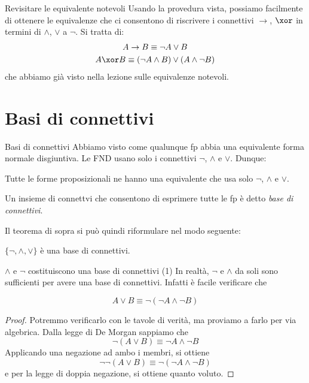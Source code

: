 \documentclass[aspectratio=169,10pt,dvipsnames,xcolor=table,handout]{beamer}
\begin{document}
\begin{frame}{Revisitare le equivalente notevoli}
    Usando la provedura vista, possiamo facilmente di ottenere le equivalenze che ci consentono di riscrivere i connettivi $\to$, $\xor$  in termini di $\wedge$, $\vee$ a $\neg$. Si tratta di:
    \begin{gather*}
        A \to B \equiv \neg A \vee B \\
        A \xor B \equiv (\neg A \wedge B) \vee (A \wedge \neg B)
    \end{gather*}
    che abbiamo già visto nella lezione sulle equivalenze notevoli.
\end{frame}

\section{Basi di connettivi}

\begin{frame}{Basi di connettivi}
    Abbiamo visto come qualunque fp abbia una equivalente forma normale disgiuntiva. Le FND usano solo i connettivi $\neg$, $\wedge$ e $\vee$. Dunque:
    \begin{theorem}
        Tutte le forme proposizionali ne hanno una equivalente che usa solo $\neg$, $\wedge$ e $\vee$.
    \end{theorem}

    \begin{definition}
        Un insieme di connettvi che consentono di esprimere tutte le fp è detto \emph{base di connettivi}.
    \end{definition}

    Il teorema di sopra si può quindi riformulare nel modo seguente:
    \begin{theorem}
        $\{ \neg, \wedge, \vee\}$ è una base di connettivi.
    \end{theorem}
\end{frame}

\begin{frame}{$\wedge$ e $\neg$ costituiscono una base di connettivi (1)}
    In realtà, $\neg$ e $\wedge$ da soli sono sufficienti per avere una base di connettivi. Infatti è facile verificare che
    \begin{theorem}
    \[
        A \vee B \equiv \neg(\neg A \wedge \neg B)
    \]
    \end{theorem}
    \begin{proof}
    Potremmo verificarlo con le tavole di verità, ma proviamo a farlo per via algebrica.
    Dalla legge di De Morgan sappiamo che
    \[
        \neg(A \vee B) \equiv \neg A \wedge \neg B
    \]
    Applicando una negazione ad ambo i membri, si ottiene
    \[
        \neg \neg (A \vee B) \equiv \neg(\neg A \wedge \neg B)
    \]
    e per la legge di doppia negazione, si ottiene quanto voluto.
    \end{proof}
\end{frame}
\end{document}
